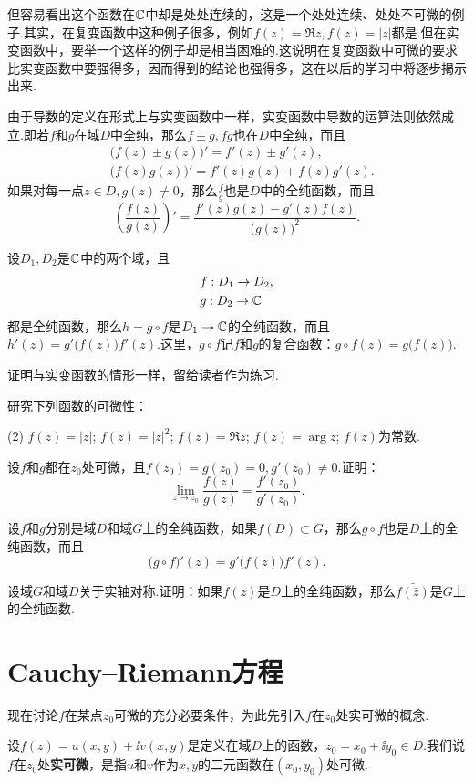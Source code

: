 但容易看出这个函数在$\mathbb C$中却是处处连续的，这是一个处处连续、处处不可微的例子.其实，在复变函数中这种例子很多，例如$f(z)=\Re z,f(z)=|z|$都是.但在实变函数中，要举一个这样的例子却是相当困难的.这说明在复变函数中可微的要求比实变函数中要强得多，因而得到的结论也强得多，这在以后的学习中将逐步揭示出来.

由于导数的定义在形式上与实变函数中一样，实变函数中导数的运算法则依然成立.即若$f$和$g$在域$D$中全纯，那么$f\pm g,fg$也在$D$中全纯，而且
\begin{align*}
  & \big( f(z) \pm g(z) \big)' = f'(z) \pm g'(z),\\
  & \big( f(z)g(z) \big)' = f'(z)g(z) + f(z)g'(z).
\end{align*}
如果对每一点$z\in D,g(z)\ne 0$，那么$\frac fg$也是$D$中的全纯函数，而且
\[
  \left(\frac{f(z)}{g(z)}\right)' = \frac{f'(z)g(z) - g'(z)f(z)}{\big(g(z)\big)^2}.
\]
\begin{prop}
  设$D_1,D_2$是$\mathbb C$中的两个域，且
  \begin{align*}
    & f:D_1 \to D_2,\\
    & g:D_2 \to \mathbb C
  \end{align*}
  都是全纯函数，那么$h=g\circ f$是$D_1\to\mathbb C$的全纯函数，而且$h'(z)=g'\big(f(z)\big)f'(z)$.这里，$g\circ f$记$f$和$g$的复合函数：$g\circ f(z)=g\big(f(z)\big)$.
\end{prop}

证明与实变函数的情形一样，留给读者作为练习.
\begin{xiti}
  \item 研究下列函数的可微性：
    \begin{tasks}(2)
      \task $f(z)=|z|$;
      \task $f(z)=|z|^2$;
      \task $f(z)=\Re z$;
      \task $f(z)=\arg z$;
      \task $f(z)$为常数.
    \end{tasks}
  \item 设$f$和$g$都在$z_0$处可微，且$f(z_0)=g(z_0)=0,g'(z_0)\ne0$.证明：
    \[
     \lim_{z\to z_0} \frac{f(z)}{g(z)} = \frac{f'(z_0)}{g'(z_0)}.
    \]
  \item 设$f$和$g$分别是域$D$和域$G$上的全纯函数，如果$f(D)\subset G$，那么$g\circ f$也是$D$上的全纯函数，而且
    \[
      \big(g\circ f\big)'(z) = g'\big(f(z)\big)f'(z).
    \]
  \item 设域$G$和域$D$关于实轴对称.证明：如果$f(z)$是$D$上的全纯函数，那么$\bar{f(\bar z)}$是$G$上的全纯函数.
\end{xiti}

\section{Cauchy--Riemann方程\label{sec2.2}}
现在讨论$f$在某点$z_0$可微的充分必要条件，为此先引入$f$在$z_0$处实可微的概念.
\begin{definition}
  设$f(z)=u(x,y)+\ii v(x,y)$是定义在域$D$上的函数，$z_0=x_0+\ii y_0\in D$.我们说$f$在$z_0$处\textbf{实可微}，是指$u$和$v$作为$x,y$的二元函数在$(x_0,y_0)$处可微.
\end{definition}

